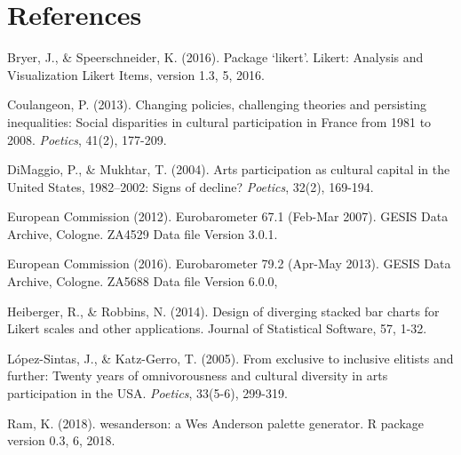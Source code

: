 \documentclass{article}
\begin{document}
\section*{References}
\noindent

Bryer, J., \& Speerschneider, K. (2016). Package ‘likert’. Likert: Analysis and Visualization Likert Items, version 1.3, 5, 2016.

Coulangeon, P. (2013). Changing policies, challenging theories and persisting inequalities: Social disparities in cultural participation in France from 1981 to 2008. \textit{Poetics}, 41(2), 177-209.

DiMaggio, P., \& Mukhtar, T. (2004). Arts participation as cultural capital in the United States, 1982–2002: Signs of decline? \textit{Poetics}, 32(2), 169-194.

European Commission (2012). Eurobarometer 67.1 (Feb-Mar 2007). GESIS Data Archive, Cologne. ZA4529 Data file Version 3.0.1. 

European Commission (2016). Eurobarometer 79.2 (Apr-May 2013). GESIS Data Archive, Cologne. ZA5688 Data file Version 6.0.0, 

Heiberger, R., \& Robbins, N. (2014). Design of diverging stacked bar charts for Likert scales and other applications. Journal of Statistical Software, 57, 1-32.

López-Sintas, J., \& Katz-Gerro, T. (2005). From exclusive to inclusive elitists and further: Twenty years of omnivorousness and cultural diversity in arts participation in the USA. \textit{Poetics}, 33(5-6), 299-319.

Ram, K. (2018). wesanderson: a Wes Anderson palette generator. R package version 0.3, 6, 2018.
\end{document}
